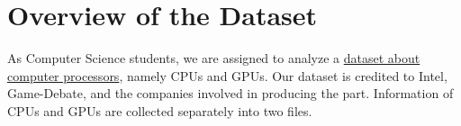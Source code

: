 \chapter{Overview of the Dataset}

As Computer Science students, we are assigned to analyze a \href{https://www.kaggle.com/datasets/iliassekkaf/computerparts/data}{dataset about computer processors}, namely CPUs and GPUs. Our dataset is credited to Intel, Game-Debate, and the companies involved in producing the part. Information of CPUs and GPUs are collected separately into two files.